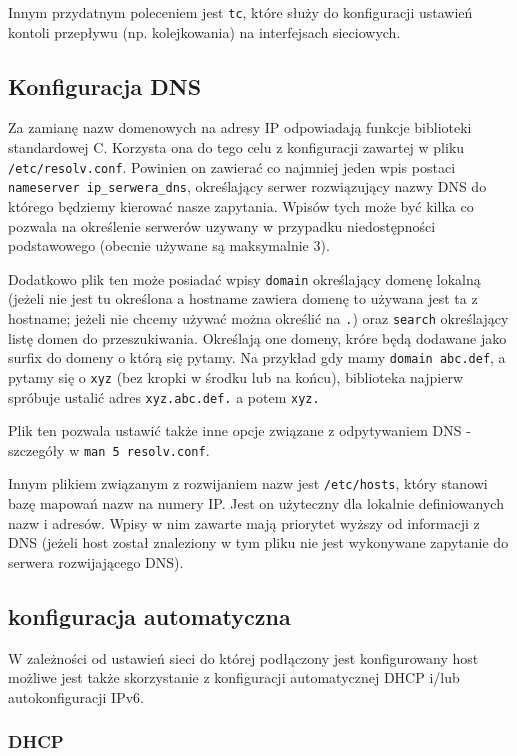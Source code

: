\documentclass{pdfBooklets}
\begin{document}
Innym przydatnym poleceniem jest \Verb#tc#, które służy do konfiguracji ustawień kontoli przepływu (np. kolejkowania) na interfejsach sieciowych. 


\subsection{Konfiguracja DNS}

Za zamianę nazw domenowych na adresy IP odpowiadają funkcje biblioteki standardowej C. Korzysta ona do tego celu z konfiguracji zawartej w pliku \Verb#/etc/resolv.conf#.
Powinien on zawierać co najmniej jeden wpis postaci \Verb#nameserver ip_serwera_dns#, określający serwer rozwiązujący nazwy DNS do którego będziemy kierować nasze zapytania.
Wpisów tych może być kilka co pozwala na określenie serwerów uzywany w przypadku niedostępności podstawowego (obecnie używane są maksymalnie 3).

Dodatkowo plik ten może posiadać wpisy
	\Verb#domain# określający domenę lokalną (jeżeli nie jest tu określona a hostname zawiera domenę to używana jest ta z hostname; jeżeli nie chcemy używać można określić na \Verb#.#) oraz
	\Verb#search# określający listę domen do przeszukiwania.
Określają one domeny, króre będą dodawane jako surfix do domeny o którą się pytamy. Na przykład gdy mamy \Verb#domain abc.def#, a pytamy się o \Verb#xyz# (bez kropki w środku lub na końcu), biblioteka najpierw spróbuje ustalić adres \Verb#xyz.abc.def.# a potem \Verb#xyz.#

Plik ten pozwala ustawić także inne opcje związane z odpytywaniem DNS - szczegóły w \Verb#man 5 resolv.conf#.

Innym plikiem związanym z rozwijaniem nazw jest \Verb#/etc/hosts#, który stanowi bazę mapowań nazw na numery IP.
Jest on użyteczny dla lokalnie definiowanych nazw i adresów.
Wpisy w nim zawarte mają priorytet wyższy od informacji z DNS (jeżeli host został znaleziony w tym pliku nie jest wykonywane zapytanie do serwera rozwijającego DNS).


\subsection{konfiguracja automatyczna}

W zależności od ustawień sieci do której podłączony jest konfigurowany host możliwe jest także skorzystanie z konfiguracji automatycznej DHCP i/lub autokonfiguracji IPv6.

\subsubsection{DHCP}
\end{document}
